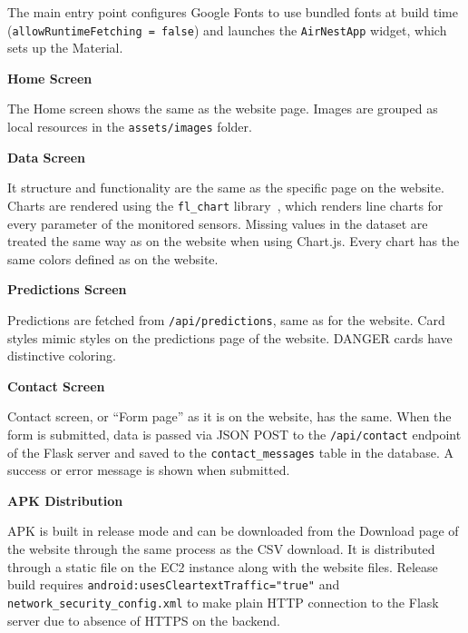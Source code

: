 The main entry point configures Google Fonts to use bundled fonts at build time
(\texttt{allowRuntimeFetching = false}) and launches the \texttt{AirNestApp} widget, which sets
up the Material.

\textbf{Home Screen}

The Home screen shows the same as the website page. Images are grouped as local resources in
the \texttt{assets/images} folder.

\textbf{Data Screen}

It structure and functionality are the same as the specific page on the website. Charts are
rendered using the \texttt{fl\_chart} library~\cite{flchart}, which renders line charts for
every parameter of the monitored sensors. Missing values in the dataset are treated the same
way as on the website when using Chart.js. Every chart has the same colors defined as on the
website.

\textbf{Predictions Screen}

Predictions are fetched from \texttt{/api/predictions}, same as for the website. Card styles
mimic styles on the predictions page of the website. DANGER cards have distinctive coloring.

\textbf{Contact Screen}

Contact screen, or ``Form page'' as it is on the website, has the same. When the form is
submitted, data is passed via JSON POST to the \texttt{/api/contact} endpoint of the Flask
server and saved to the \texttt{contact\_messages} table in the database. A success or error
message is shown when submitted.

\textbf{APK Distribution}

APK is built in release mode and can be downloaded from the Download page of the website
through the same process as the CSV download. It is distributed through a static file on the
EC2 instance along with the website files. Release build requires
\texttt{android:usesCleartextTraffic="true"} and \texttt{network\_security\_config.xml} to
make plain HTTP connection to the Flask server due to absence of HTTPS on the backend.
